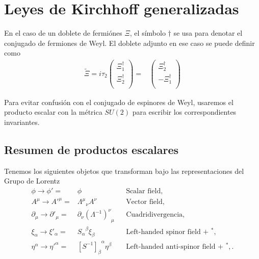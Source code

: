 \section{Leyes de Kirchhoff generalizadas}


En el caso de un doblete de fermiónes $\Xi$, el símbolo  $\dagger$ se usa para denotar el conjugado de fermiones de Weyl. El doblete adjunto en ese caso se puede definir como
\begin{align}
\label{eq:Xiadj}
 \widetilde{\Xi}=i\tau_2 \begin{pmatrix}
                  \Xi_1^{\dagger}\\
                  \Xi_2^{\dagger}\\
                \end{pmatrix}
=& \begin{pmatrix}
                  \Xi_2^{\dagger}\\
                 -\Xi_1^{\dagger}\\
                \end{pmatrix}
\end{align}

Para evitar confusión con el conjugado de espinores de Weyl, usaremos el producto escalar con la métrica $SU(2)$ para escribir los correspondientes invariantes.


\subsection{Resumen de productos escalares}

\begin{frame}
Tenemos los siguientes objetos que transforman bajo las representaciones del Grupo de Lorentz
\begin{align}
   \phi\to \phi'=&\phi && \text{Scalar field,}\nonumber\\
   A^\mu\to {A'}^\mu=&{\Lambda^\mu}_\nu A^\nu&&\text{Vector field,}\nonumber\\
  \partial_{\mu}\to \partial'_{\mu}=&\partial_{\nu} {\left( \Lambda^{-1} \right)^{\nu}}_{\mu}&&\text{Cuadridivergencia,}\nonumber\\
  \xi_\alpha\to\xi'_\alpha=&{S_\alpha}^\beta\xi_\beta
&& \text{Left-handed spinor field + ${}^{*}$,}\nonumber\\
\eta^{\alpha}\to {\eta'}^{\alpha} =&{\left[  S^{-1}  \right]_{\beta}}^{\alpha}\eta^\beta&&
 \text{Left-handed anti-spinor field + ${}^{*}$,}\,.
 \end{align}
\end{frame}



